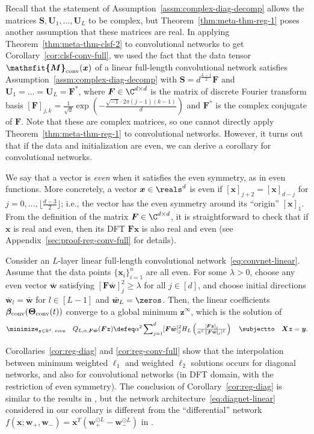 \documentclass{article} %
\def\vw{{\bm{w}}}
\def\vx{{\bm{x}}}
\def\vy{{\bm{y}}}
\def\vz{{\bm{z}}}
\def\mF{{\bm{F}}}
\def\mS{{\bm{S}}}
\def\mU{{\bm{U}}}
\def\mX{{\bm{X}}}
\newcommand{\tens}[1]{\bm{\mathsfit{#1}}}
\def\tM{{\tens{M}}}
\newcommand{\R}{\mathbb{R}}
\newcommand{\vbeta}{{\bm{\beta}}}
\newcommand{\vbetaconv}{\vbeta_{\rm conv}}
\newcommand{\bTheta}{\bm{\Theta}}
\newcommand{\bThetaconv}{\bTheta_{\rm conv}}
\newcommand{\tMconv}{\tM_{\rm conv}}
\begin{document}
Recall that the statement of Assumption~\ref{assm:complex-diag-decomp} allows the matrices $\mS, \mU_1, \dots, \mU_L$ to be complex, but Theorem~\ref{thm:meta-thm-reg-1} poses another assumption that these matrices are real.
In applying Theorem~\ref{thm:meta-thm-clsf-2} to convolutional networks to get Corollary~\ref{cor:clsf-conv-full}, we used the fact that the data tensor $\tMconv(\vx)$ of a linear full-length convolutional network satisfies Assumption~\ref{assm:complex-diag-decomp} with $\mS = d^{\frac{L-1}{2}} \mF$ and $\mU_1 = \dots = \mU_L = \mF^*$, where $\mF \in \C^{d \times d}$ is the matrix of discrete Fourier transform basis $[\mF]_{j,k} = \frac{1}{\sqrt{d}} \exp(-\frac{\sqrt{-1} \cdot 2 \pi (j-1)(k-1)}{d})$ and $\mF^*$ is the complex conjugate of $\mF$.
Note that these are complex matrices, so one cannot directly apply Theorem~\ref{thm:meta-thm-reg-1} to convolutional networks. However, it turns out that if the data and initialization are even, we can derive a corollary for convolutional networks.


We say that a vector is \emph{even} when it satisfies the even symmetry, as in even functions. More concretely,
a vector $\vx \in \reals^d$ is even if $[\vx]_{j+2} = [\vx]_{d-j}$ for $j = 0, \dots, \lfloor \frac{d-3}{2} \rfloor$; i.e., the vector has the even symmetry around its ``origin'' $[\vx]_1$. From the definition of the matrix $\mF \in \C^{d \times d}$, it is straightforward to check that if $\vx$ is real and even, then its DFT $\mF \vx$ is also real and even (see Appendix~\ref{sec:proof-reg-conv-full} for details).

\begin{corollary}
\label{cor:reg-conv-full}
Consider an $L$-layer linear full-length convolutional network~\eqref{eq:convnet-linear}. Assume that the data points $\{\vx_i\}_{i=1}^n$ are all even. For some $\lambda > 0$, choose any even vector $\bar \vw$ satisfying $[\mF \bar \vw]_j^2 \geq \lambda$ for all $j \in [d]$, and choose initial directions $\bar \vw_l = \bar \vw$ for $l \in [L-1]$ and $\bar \vw_L = \zeros$. Then, the linear coefficients $\vbetaconv(\bThetaconv(t))$ converge to a global minimum $\vz^\infty$, which is the solution of
\begin{equation*}
    \minimize_{\vz \in \R^d,\textup{ even}}\quad Q_{L, \alpha, \mF \bar \vw}(\mF \vz)
    \defeq
    \alpha^2 \sum\nolimits_{j=1}^d [\mF \bar \vw]_j^2 H_L \left ( 
    \tfrac{[\mF \vz]_j}{\alpha^L |[\mF \bar \vw]_j|^L}
    \right )
    \quad
    \subjectto \quad \mX \vz = \vy.
\end{equation*}
\end{corollary}
Corollaries~\ref{cor:reg-diag} and \ref{cor:reg-conv-full} show that the interpolation between minimum weighted $\ell_1$ and weighted $\ell_2$ solutions occurs for diagonal networks, and also for convolutional networks (in DFT domain, with the restriction of even symmetry).
The conclusion of Corollary~\ref{cor:reg-diag} is similar to the results in \citet{woodworth2020kernel}, but the network architecture~\eqref{eq:diagnet-linear} considered in our corollary is different from the ``differential'' network $f(\vx;\vw_+,\vw_-) = \vx^T(\vw_+^{\odot L}-\vw_-^{\odot L})$ in \citet{woodworth2020kernel}.
\end{document}
